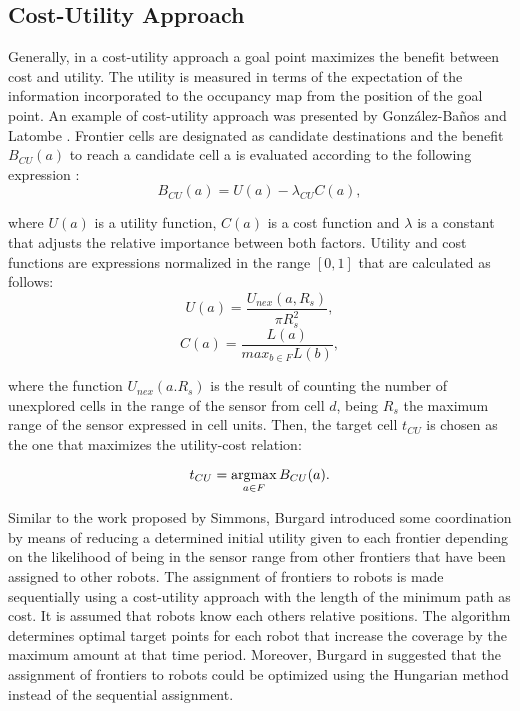 \subsection{Cost-Utility Approach}

Generally, in a cost-utility approach a goal point maximizes the benefit between cost and utility. The utility is measured in terms of the expectation of the information incorporated to the occupancy map from the position of the goal point. An example of cost-utility approach was presented by González-Baños and Latombe \cite{GonzlezBaos2002}. Frontier cells are designated as candidate destinations and the benefit $B_{CU}(a)$ to reach a candidate cell a is evaluated according to the following expression \cite{Julia2012}:
\begin{equation}
B_{CU}(a) = U(a) - \lambda_{CU}C(a),
\end{equation}

where $U(a)$ is a utility function, $C(a)$ is a cost function and $\lambda$ is a constant that adjusts the relative importance between both factors. Utility and cost functions are expressions normalized in the range $\left[0, 1\right]$ that are calculated as follows:
\begin{equation}
U(a) = \frac{U_{nex}(a, R_{s})}{\pi R_{s}^{2}},
\end{equation}
\begin{equation}
C(a) = \frac{L(a)}{max_{b \in F}L(b)},
\end{equation}

where the function $U_{nex}(a. R_{s})$ is the result of counting the number of unexplored cells in the range of the sensor from cell $d$, being $R_{s}$ the maximum range of the sensor expressed in cell units.
Then, the target cell $t_{CU}$ is chosen as the one that maximizes the utility-cost relation:

\begin{equation}
t_{CU} = \operatorname*{argmax}_{a \in F} B_{CU}(a).
\end{equation}

Similar to the work proposed by Simmons, Burgard \cite{Burgard2000} introduced some coordination by means of reducing a determined initial utility given to each frontier depending on the likelihood of being in the sensor range from other frontiers that have been assigned to other robots. The assignment of frontiers to robots is made sequentially using a cost-utility approach with the length of the minimum path as cost. It is assumed that robots know each others relative positions. The algorithm determines optimal target points for each robot that increase the coverage by the maximum amount at that time period. Moreover, Burgard in \cite{Burgard2005} suggested that the assignment of frontiers to robots could be optimized using the Hungarian method \cite{Kuhn1955} instead of the sequential assignment.

